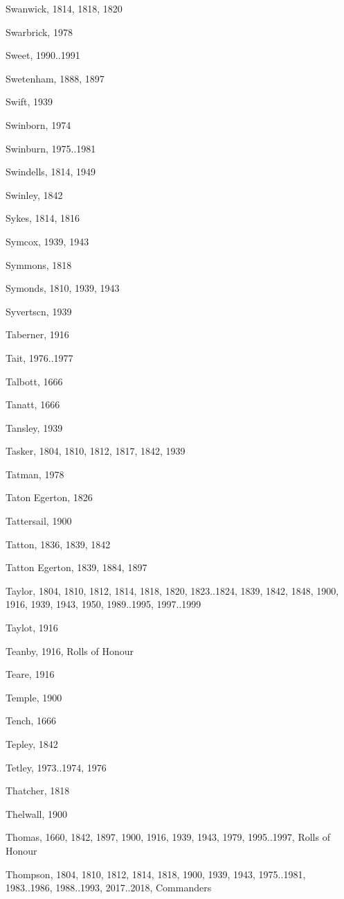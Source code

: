 \begin{theindex}
\item Swanwick, 1814, 1818, 1820
\item Swarbrick, 1978
\item Sweet, 1990..1991
\item Swetenham, 1888, 1897
\item Swift, 1939
\item Swinborn, 1974
\item Swinburn, 1975..1981
\item Swindells, 1814, 1949
\item Swinley, 1842
\item Sykes, 1814, 1816
\item Symcox, 1939, 1943
\item Symmons, 1818
\item Symonds, 1810, 1939, 1943
\item Syvertscn, 1939
\item Taberner, 1916
\item Tait, 1976..1977
\item Talbott, 1666
\item Tanatt, 1666
\item Tansley, 1939
\item Tasker, 1804, 1810, 1812, 1817, 1842, 1939
\item Tatman, 1978
\item Taton Egerton, 1826
\item Tattersail, 1900
\item Tatton, 1836, 1839, 1842
\item Tatton Egerton, 1839, 1884, 1897
\item Taylor, 1804, 1810, 1812, 1814, 1818, 1820, 1823..1824, 1839, 1842, 1848, 1900, 1916, 1939, 1943, 1950, 1989..1995, 1997..1999
\item Taylot, 1916
\item Teanby, 1916, Rolls of Honour
\item Teare, 1916
\item Temple, 1900
\item Tench, 1666
\item Tepley, 1842
\item Tetley, 1973..1974, 1976
\item Thatcher, 1818
\item Thelwall, 1900
\item Thomas, 1660, 1842, 1897, 1900, 1916, 1939, 1943, 1979, 1995..1997, Rolls of Honour
\item Thompson, 1804, 1810, 1812, 1814, 1818, 1900, 1939, 1943, 1975..1981, 1983..1986, 1988..1993, 2017..2018, Commanders

\end{theindex}
